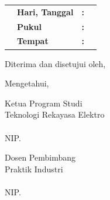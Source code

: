 \begin{table}[h!]
    \begin{tabular}{p{1cm} p{3cm} p{1cm} l}
        & \textbf{Hari, Tanggal} & \textbf{:} & \\ 
        & \textbf{Pukul}         & \textbf{:} & \\ 
        & \textbf{Tempat}        & \textbf{:} & \\[1cm]
    \end{tabular}
    \label{tabel1}
\end{table}

\begin{center}
    Diterima dan disetujui oleh,
\end{center}

\begin{center}
    Mengetahui, \\[1cm]
\end{center}
\begin{minipage}{0.35\textwidth}
    Ketua Program Studi\\
    Teknologi Rekayasa Elektro\\[2.5cm]
    \underline{\koorprodi}\\
    NIP. \NIPkoorprodi
\end{minipage}%
\hfill
 \begin{minipage}{0.35\textwidth}
    Dosen Pembimbang \\
    Praktik Industri \\[2cm]
    
    \underline{\pembimbing}\\
    NIP. \NIPpembimbing
\end{minipage}